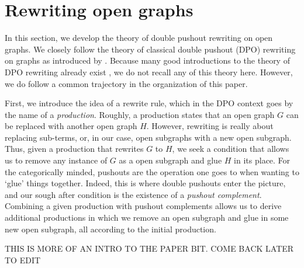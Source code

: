 %
%

	

\section{Rewriting open graphs} %


In this section, we develop the theory
of double pushout rewriting on open graphs.
We closely follow the theory of
classical double pushout (DPO) rewriting 
on graphs as introduced by 
.
Because many good introductions
to the theory of DPO rewriting
already exist
,
we do not recall any of this
theory here.  
However, we do follow a
common trajectory in the 
organization of this paper.

First, we introduce the idea
of a rewrite rule, 
which in the DPO context goes 
by the name of a \emph{production}.
Roughly, a production states that
an open graph $G$ can be replaced
with another open graph $H$.
However, rewriting is really
about replacing sub-terms,
or, in our case, open subgraphs
with a new open subgraph.  
Thus, given a production that
rewrites $G$ to $H$,
we seek a condition that allows us to
remove any instance of $G$ as a
open subgraph and glue $H$
in its place.
For the categorically minded,
pushouts are the operation
one goes to when wanting to
`glue' things together. 
Indeed, this is where 
double pushouts enter the picture,
and our sough after condition
is the existence of 
a \emph{pushout complement}.
Combining a given production with
pushout complements allows us
to derive additional productions
in which we remove an
open subgraph and glue in
some new open subgraph,
all according to the initial production.

{\color{red} THIS IS MORE OF AN INTRO
TO THE PAPER BIT. COME BACK LATER TO EDIT}


